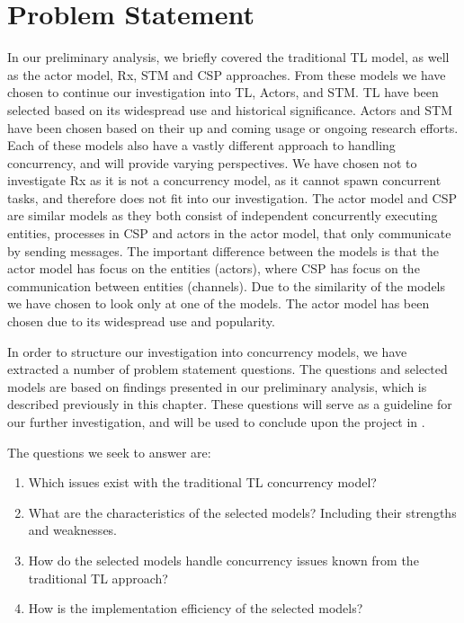 \section{Problem Statement}\label{sec:problemstatement}
In our preliminary analysis, we briefly covered the traditional \ac{TL} model, as well as the actor model, \ac{Rx}, \ac{STM} and \ac{CSP} approaches. From these models we have chosen to continue our investigation into \ac{TL}, Actors, and \ac{STM}. \ac{TL} have been selected based on its widespread use and historical significance. Actors and \ac{STM} have been chosen based on their up and coming usage or ongoing research efforts. Each of these models also have a vastly different approach to handling concurrency, and will provide varying perspectives. We have chosen not to investigate \ac{Rx} as it is not a concurrency model, as it cannot spawn concurrent tasks, and therefore does not fit into our investigation. The actor model and CSP are similar models as they both consist of independent concurrently executing entities, processes in CSP and actors in the actor model, that only communicate by sending messages. The important difference between the models is that the actor model has focus on the entities (actors), where CSP has focus on the communication between entities (channels)\cite[p. 153]{sevenModels}. Due to the similarity of the models we have chosen to look only at one of the models. The actor model has been chosen due to its widespread use and popularity.

In order to structure our investigation into concurrency models, we have extracted a number of problem statement questions. The questions and selected models are based on findings presented in our preliminary analysis, which is described previously in this chapter. These questions will serve as a guideline for our further investigation, and will be used to conclude upon the project in .

The questions we seek to answer are:
\begin{enumerate}
\item Which issues exist with the traditional \ac{TL} concurrency model?
\item What are the characteristics of the selected models? Including their strengths and weaknesses.
\item How do the selected models handle concurrency issues known from the traditional \ac{TL} approach?
\item How is the implementation efficiency of the selected models?
\end{enumerate}

